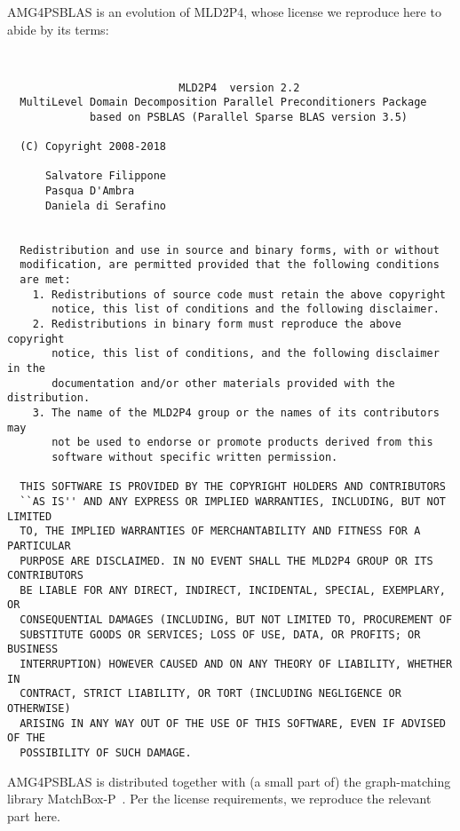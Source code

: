 \newpage
 AMG4PSBLAS is an evolution of MLD2P4, whose license we reproduce here
 to abide by its terms: {\small
\begin{verbatim}


                           MLD2P4  version 2.2
  MultiLevel Domain Decomposition Parallel Preconditioners Package
             based on PSBLAS (Parallel Sparse BLAS version 3.5)

  (C) Copyright 2008-2018

      Salvatore Filippone
      Pasqua D'Ambra
      Daniela di Serafino


  Redistribution and use in source and binary forms, with or without
  modification, are permitted provided that the following conditions
  are met:
    1. Redistributions of source code must retain the above copyright
       notice, this list of conditions and the following disclaimer.
    2. Redistributions in binary form must reproduce the above copyright
       notice, this list of conditions, and the following disclaimer in the
       documentation and/or other materials provided with the distribution.
    3. The name of the MLD2P4 group or the names of its contributors may
       not be used to endorse or promote products derived from this
       software without specific written permission.

  THIS SOFTWARE IS PROVIDED BY THE COPYRIGHT HOLDERS AND CONTRIBUTORS
  ``AS IS'' AND ANY EXPRESS OR IMPLIED WARRANTIES, INCLUDING, BUT NOT LIMITED
  TO, THE IMPLIED WARRANTIES OF MERCHANTABILITY AND FITNESS FOR A PARTICULAR
  PURPOSE ARE DISCLAIMED. IN NO EVENT SHALL THE MLD2P4 GROUP OR ITS CONTRIBUTORS
  BE LIABLE FOR ANY DIRECT, INDIRECT, INCIDENTAL, SPECIAL, EXEMPLARY, OR
  CONSEQUENTIAL DAMAGES (INCLUDING, BUT NOT LIMITED TO, PROCUREMENT OF
  SUBSTITUTE GOODS OR SERVICES; LOSS OF USE, DATA, OR PROFITS; OR BUSINESS
  INTERRUPTION) HOWEVER CAUSED AND ON ANY THEORY OF LIABILITY, WHETHER IN
  CONTRACT, STRICT LIABILITY, OR TORT (INCLUDING NEGLIGENCE OR OTHERWISE)
  ARISING IN ANY WAY OUT OF THE USE OF THIS SOFTWARE, EVEN IF ADVISED OF THE
  POSSIBILITY OF SUCH DAMAGE.

\end{verbatim}
   }
\pagebreak
AMG4PSBLAS is distributed together with (a small part of) the graph-matching
library MatchBox-P~\cite{MatchBoxP}. Per the license requirements, we reproduce
the relevant part here.
